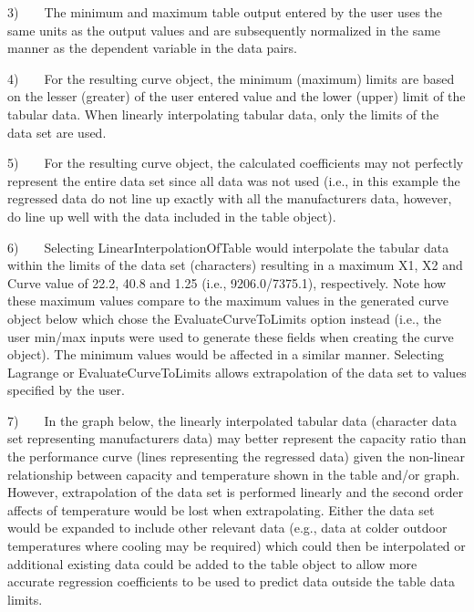 3)~~~~The minimum and maximum table output entered by the user uses the same units as the output values and are subsequently normalized in the same manner as the dependent variable in the data pairs.

4)~~~~For the resulting curve object, the minimum (maximum) limits are based on the lesser (greater) of the user entered value and the lower (upper) limit of the tabular data. When linearly interpolating tabular data, only the limits of the data set are used.

5)~~~~For the resulting curve object, the calculated coefficients may not perfectly represent the entire data set since all data was not used (i.e., in this example the regressed data do not line up exactly with all the manufacturers data, however, do line up well with the data included in the table object).

6)~~~~Selecting LinearInterpolationOfTable would interpolate the tabular data within the limits of the data set (characters) resulting in a maximum X1, X2 and Curve value of 22.2, 40.8 and 1.25 (i.e., 9206.0/7375.1), respectively. Note how these maximum values compare to the maximum values in the generated curve object below which chose the EvaluateCurveToLimits option instead (i.e., the user min/max inputs were used to generate these fields when creating the curve object). The minimum values would be affected in a similar manner. Selecting Lagrange or EvaluateCurveToLimits allows extrapolation of the data set to values specified by the user.

7)~~~~In the graph below, the linearly interpolated tabular data (character data set representing manufacturers data) may better represent the capacity ratio than the performance curve (lines representing the regressed data) given the non-linear relationship between capacity and temperature shown in the table and/or graph. However, extrapolation of the data set is performed linearly and the second order affects of temperature would be lost when extrapolating. Either the data set would be expanded to include other relevant data (e.g., data at colder outdoor temperatures where cooling may be required) which could then be interpolated or additional existing data could be added to the table object to allow more accurate regression coefficients to be used to predict data outside the table data limits.

